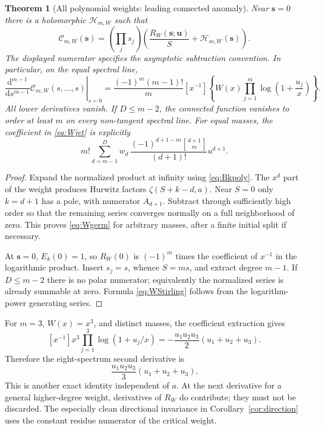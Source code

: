 \documentclass[11pt]{article}
\numberwithin{equation}{section}
\newtheorem{theorem}{Theorem}[section]
\theoremstyle{definition}\newtheorem{definition}[theorem]{Definition}
\theoremstyle{remark}\newtheorem{remark}[theorem]{Remark}
\newcommand{\bs}{\boldsymbol{s}}
\newcommand{\bu}{\boldsymbol{u}}
\newcommand{\cH}{\mathcal H}
\newcommand{\cC}{\mathcal C}
\newcommand{\stirling}[2]{\genfrac{[}{]}{0pt}{}{#1}{#2}}
\begin{document}
\begin{theorem}[All polynomial weights: leading connected anomaly]\label{thm:polyweight}
Near $\bs=0$ there is a holomorphic $\cH_{m,W}$ such that
\begin{equation}\label{eq:Wgerm}
 \cC_{m,W}(\bs)=\left(\prod_js_j\right)
 \left(\frac{R_W(\bs;\bu)}S+\cH_{m,W}(\bs)\right).
\end{equation}
The displayed numerator specifies the asymptotic subtraction convention. In particular, on the equal spectral line,
\begin{equation}\label{eq:Wjet}
 \left.\frac{\mathrm d^{m-1}}{\mathrm ds^{m-1}}
   \cC_{m,W}(s,\ldots,s)\right|_{s=0}
 =\frac{(-1)^m(m-1)!}{m}
 [x^{-1}]\left\{W(x)\prod_{j=1}^m\log\left(1+\frac{u_j}{x}\right)\right\}.
\end{equation}
All lower derivatives vanish. If $D\le m-2$, the connected function vanishes to order at least $m$ on every non-tangent spectral line. For equal masses, the coefficient in \eqref{eq:Wjet} is explicitly
\begin{equation}\label{eq:WStirling}
 m!\sum_{d=m-1}^D w_d\,
 \frac{(-1)^{d+1-m}\stirling{d+1}{m}}{(d+1)!}u^{d+1}.
\end{equation}
\end{theorem}
\begin{proof}
Expand the normalized product at infinity using \eqref{eq:Bkpoly}. The $x^d$ part of the weight produces Hurwitz factors $\zeta(S+k-d,a)$. Near $S=0$ only $k=d+1$ has a pole, with numerator $A_{d+1}$. Subtract through sufficiently high order so that the remaining series converges normally on a full neighborhood of zero. This proves \eqref{eq:Wgerm} for arbitrary masses, after a finite initial split if necessary.

At $\bs=0$, $E_k(0)=1$, so $R_W(0)$ is $(-1)^m$ times the coefficient of $x^{-1}$ in the logarithmic product. Insert $s_j=s$, whence $S=ms$, and extract degree $m-1$. If $D\le m-2$ there is no polar numerator; equivalently the normalized series is already summable at zero. Formula \eqref{eq:WStirling} follows from the logarithm-power generating series.
\end{proof}

For $m=3$, $W(x)=x^3$, and distinct masses, the coefficient extraction gives
\[
 [x^{-1}]x^3\prod_{j=1}^3\log(1+u_j/x)
 =-\frac{u_1u_2u_3}{2}(u_1+u_2+u_3).
\]
Therefore the eight-spectrum second derivative is
\begin{equation}\label{eq:cubicweightthree}
 \frac{u_1u_2u_3}{3}(u_1+u_2+u_3).
\end{equation}
This is another exact identity independent of $a$. At the next derivative for a general higher-degree weight, derivatives of $R_W$ do contribute; they must not be discarded. The especially clean directional invariance in Corollary~\ref{cor:direction} uses the constant residue numerator of the critical weight.
\end{document}
